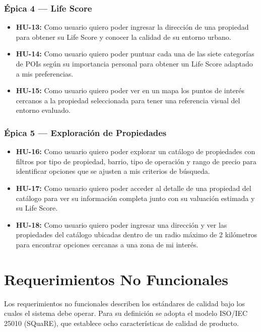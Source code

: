 \subsubsection{Épica 4 --- Life Score}

\begin{itemize}
\item \textbf{HU-13:} Como usuario quiero poder ingresar la dirección de una propiedad para obtener su Life Score y conocer la calidad de su entorno urbano.
\item \textbf{HU-14:} Como usuario quiero poder puntuar cada una de las siete categorías de POIs según su importancia personal para obtener un Life Score adaptado a mis preferencias.
\item \textbf{HU-15:} Como usuario quiero poder ver en un mapa los puntos de interés cercanos a la propiedad seleccionada para tener una referencia visual del entorno evaluado.
\end{itemize}

\subsubsection{Épica 5 --- Exploración de Propiedades}

\begin{itemize}
\item \textbf{HU-16:} Como usuario quiero poder explorar un catálogo de propiedades con filtros por tipo de propiedad, barrio, tipo de operación y rango de precio para identificar opciones que se ajusten a mis criterios de búsqueda.
\item \textbf{HU-17:} Como usuario quiero poder acceder al detalle de una propiedad del catálogo para ver su información completa junto con su valuación estimada y su Life Score.
\item \textbf{HU-18:} Como usuario quiero poder ingresar una dirección y ver las propiedades del catálogo ubicadas dentro de un radio máximo de 2 kilómetros para encontrar opciones cercanas a una zona de mi interés.
\end{itemize}

\section{Requerimientos No Funcionales}

Los requerimientos no funcionales describen los estándares de calidad bajo los cuales el sistema debe operar. Para su definición se adopta el modelo ISO/IEC 25010 (SQuaRE), que establece ocho características de calidad de producto.

